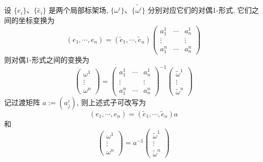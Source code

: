         \begin{proposition}[坐标变换]
            设 $\{e_i\}$、$\{\tilde{e_i}\}$ 是两个局部标架场, $\{\omega^i\}$、$\{\tilde{\omega^i}\}$ 分别对应它们的对偶1-形式, 它们之间的坐标变换为
            \begin{equation*}
                (e_1,\cdots,e_n) = (\tilde{e}_1,\cdots,\tilde{e}_n)
                \begin{pmatrix}
                    a^1_1 & \cdots & a^1_n \\
                    \vdots & & \vdots \\
                    a^n_1 & \cdots & a^n_n
                \end{pmatrix}
            \end{equation*}
            则对偶1-形式之间的变换为
            \begin{equation*}
                \begin{pmatrix}
                    \omega^1 \\ \vdots \\ \omega^n
                \end{pmatrix} = 
                \begin{pmatrix}
                    a^1_1 & \cdots & a^1_n \\
                    \vdots & & \vdots \\
                    a^n_1 & \cdots & a^n_n
                \end{pmatrix}^{-1}
                \begin{pmatrix}
                    \tilde{\omega}^1 \\ \vdots \\ \tilde{\omega}^n
                \end{pmatrix}
            \end{equation*}
            记过渡矩阵 $a := (a^i_j)$, 则上述式子可改写为
            \begin{equation}
                (e_1,\cdots,e_n) = (\tilde{e}_1,\cdots,\tilde{e}_n)a
            \end{equation}
            和
            \begin{equation}
                \begin{pmatrix}
                    \omega^1 \\ \vdots \\ \omega^n
                \end{pmatrix} = a^{-1}
                \begin{pmatrix}
                    \tilde{\omega}^1 \\ \vdots \\ \tilde{\omega}^n

\end{pmatrix}
\end{equation}
\end{proposition}
